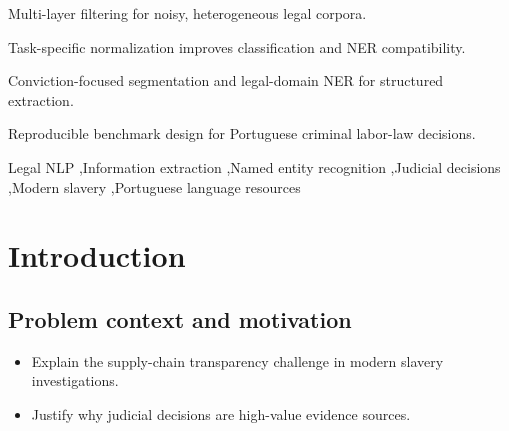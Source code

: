 \documentclass[preprint,a4paper,fleqn]{cas-dc}
\begin{document}
\begin{abstract}
This paper presents a multi-layer legal NLP framework for extracting structured information from Brazilian criminal labor-law judicial decisions related to modern slavery. Starting from a heterogeneous corpus (2,581 documents), the framework applies: (i) document-type filtering to retain only final decisions, (ii) legal-text normalization with task-specific outputs for classification and NER, (iii) penal-merit classification using Legal-BERT embeddings with classical classifiers, (iv) LLM-assisted sentence segmentation for conviction-focused documents, and (v) legal-domain NER for entity extraction. We describe the full pipeline, evaluation protocol, and error analysis, and discuss practical deployment constraints, reproducibility, and ethical/legal considerations. Results indicate that layered filtering and task-oriented preprocessing substantially improve downstream extraction quality in low-resource legal settings.
\end{abstract}

\begin{highlights}
\item Multi-layer filtering for noisy, heterogeneous legal corpora.
\item Task-specific normalization improves classification and NER compatibility.
\item Conviction-focused segmentation and legal-domain NER for structured extraction.
\item Reproducible benchmark design for Portuguese criminal labor-law decisions.
\end{highlights}

\begin{keywords}
Legal NLP \sep Information extraction \sep Named entity recognition \sep Judicial decisions \sep Modern slavery \sep Portuguese language resources
\end{keywords}

\maketitle

\section{Introduction}
\label{sec:introduction}
\subsection{Problem context and motivation}
\begin{itemize}
    \item Explain the supply-chain transparency challenge in modern slavery investigations.
    \item Justify why judicial decisions are high-value evidence sources.
\end{itemize}
\end{document}
